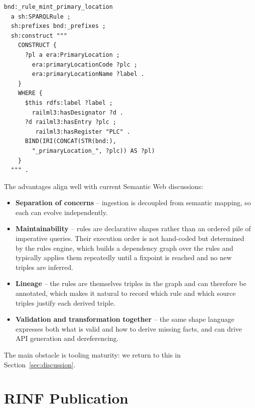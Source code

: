 \documentclass{ceurart}
\begin{document}
\begin{lstlisting}[language=sparql,caption={A SHACL-AF rule mapping the
  railML-centred graph towards the RINF/ERA view: each operational point with a
  PLC designator yields an \allowbreak\mbox{\texttt{era:PrimaryLocation}}. The rule is attached to
  a node shape whose target selects the currently valid operational
  points.},label={lst:shaclrule}]
bnd:_rule_mint_primary_location
  a sh:SPARQLRule ;
  sh:prefixes bnd:_prefixes ;
  sh:construct """
    CONSTRUCT {
      ?pl a era:PrimaryLocation ;
        era:primaryLocationCode ?plc ;
        era:primaryLocationName ?label .
    }
    WHERE {
      $this rdfs:label ?label ;
        railml3:hasDesignator ?d .
      ?d railml3:hasEntry ?plc ;
         railml3:hasRegister "PLC" .
      BIND(IRI(CONCAT(STR(bnd:),
        "_primaryLocation_", ?plc)) AS ?pl)
    }
  """ .
\end{lstlisting}

The advantages align well with current Semantic Web discussions:

\begin{itemize}
  \item \textbf{Separation of concerns} -- ingestion is decoupled from semantic
        mapping, so each can evolve independently.
  \item \textbf{Maintainability} -- rules are declarative shapes rather than an
        ordered pile of imperative queries. Their execution order is not
        hand-coded but determined by the rules engine, which builds a dependency
        graph over the rules and typically applies them repeatedly until a
        fixpoint is reached and no new triples are inferred.
  \item \textbf{Lineage} -- the rules are themselves triples in the graph and can
        therefore be annotated, which makes it natural to record which rule and
        which source triples justify each derived triple.
  \item \textbf{Validation and transformation together} -- the same shape
        language expresses both what is valid and how to derive missing facts,
        and can drive API generation and dereferencing.
\end{itemize}

The main obstacle is tooling maturity: we return to this in
Section~\ref{sec:discussion}.

\section{RINF Publication}
\label{sec:rinf}
\end{document}

